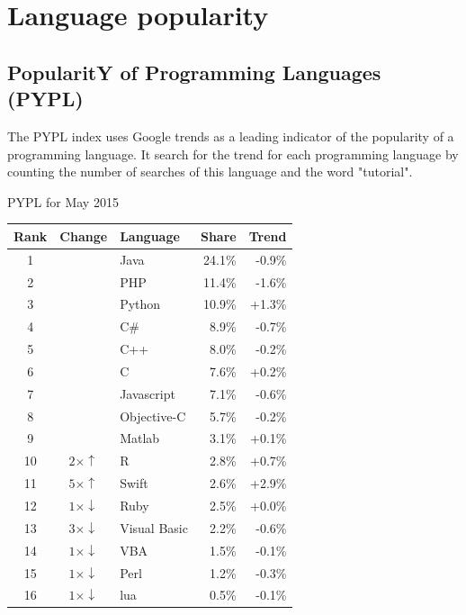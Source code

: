 \chapter{Language popularity} \label{appendix:langpop}

\section{PopularitY of Programming Languages (PYPL)}
The PYPL index uses Google trends as a leading indicator of the popularity of a programming language.
It search for the trend for each programming language by counting the number of searches of this language and the word "tutorial".



PYPL for May 2015\\
\begin{tabular}{c c l r r}
Rank & Change              & Language        & Share  & Trend   \\ \hline
1    &                     & Java            & 24.1\% & -0.9\%  \\ \hline
2    &                     & PHP             & 11.4\% & -1.6\%  \\ \hline
3    &                     & Python          & 10.9\% & +1.3\%  \\ \hline
4    &                     & C\#             & 8.9\%  & -0.7\%  \\ \hline
5    &                     & C++             & 8.0\%  & -0.2\%  \\ \hline
6    &                     & C               & 7.6\%  & +0.2\%  \\ \hline
7    &                     & Javascript      & 7.1\%  & -0.6\%  \\ \hline
8    &                     & Objective-C     & 5.7\%  & -0.2\%  \\ \hline
9    &                     & Matlab          & 3.1\%  & +0.1\%  \\ \hline
10   & $2\times\uparrow$   & R               & 2.8\%  & +0.7\%  \\ \hline
11   & $5\times\uparrow$   & Swift           & 2.6\%  & +2.9\%  \\ \hline
12   & $1\times\downarrow$ & Ruby            & 2.5\%  & +0.0\%  \\ \hline
13   & $3\times\downarrow$ & Visual Basic    & 2.2\%  & -0.6\%  \\ \hline
14   & $1\times\downarrow$ & VBA             & 1.5\%  & -0.1\%  \\ \hline
15   & $1\times\downarrow$ & Perl            & 1.2\%  & -0.3\%  \\ \hline
16   & $1\times\downarrow$ & lua             & 0.5\%  & -0.1\%  \\ \hline
\end{tabular}



